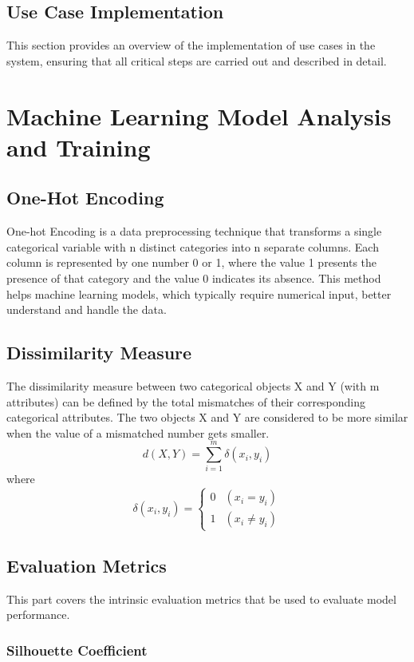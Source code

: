 \documentclass[12pt]{article}
\begin{document}
\subsection{Use Case Implementation}
This section provides an overview of the implementation of use cases in the system, ensuring that
all critical steps are carried out and described in detail.
    
    
    

\section{Machine Learning Model Analysis and Training}
\subsection{One-Hot Encoding}
One-hot Encoding is a data preprocessing technique that transforms a single categorical variable with n distinct categories 
into n separate columns. Each column is represented by one number 0 or 1, where the value 1 presents the presence of that category 
and the value 0 indicates its absence.\citep{thuy2020optimize} This method helps machine learning models, which typically require numerical input, 
better understand and handle the data.

\subsection{Dissimilarity Measure}
The dissimilarity measure between two categorical objects X and Y (with m attributes) can be defined by the total mismatches of their corresponding categorical attributes. The two objects X and Y are considered to be more similar when the value of a mismatched number gets smaller.\citep{huang1998extensions}
        $$d(X,Y) = \sum_{i=1}^{m}\delta{(x_i,y_i)}$$ where $$\delta{(x_i,y_i)} = \left\{\begin{array}{ll} 0 & (x_i = y_i) \\
        1 & (x_i \neq y_i)\end{array}\right.$$

\subsection{Evaluation Metrics} \label{evaluation metrics}
This part covers the intrinsic evaluation metrics that be used to evaluate model performance.

\subsubsection{Silhouette Coefficient}
\end{document}
